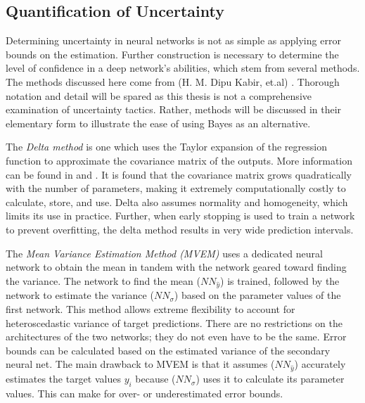 \subsection{Quantification of Uncertainty}

Determining uncertainty in neural networks is not as simple as applying error bounds on the estimation.  Further construction is necessary to determine the level of confidence in a deep network's abilities, which stem from several methods.  The methods discussed here come from (H. M. Dipu Kabir, et.al) \cite{8371683}.  Thorough notation and detail will be spared as this thesis is not a comprehensive examination of uncertainty tactics.  Rather, methods will be discussed in their elementary form to illustrate the ease of using Bayes as an alternative.

The \textit{Delta method} is one which uses the Taylor expansion of the regression function to approximate the covariance matrix of the outputs.  More information can be found in \cite{nilsen2022epistemic} and \cite{hwang1997prediction}.  It is found that the covariance matrix grows quadratically with the number of parameters, making it extremely computationally costly to calculate, store, and use.  Delta also assumes normality and homogeneity, which limits its use in practice.  Further, when early stopping is used to train a network to prevent overfitting, the delta method results in very wide prediction intervals.

The \textit{Mean Variance Estimation Method (MVEM)} uses a dedicated neural network to obtain the mean in tandem with the network geared toward finding the variance.  The network to find the mean ($NN_{\hat{y}}$) is trained, followed by the network to estimate the variance ($NN_{\sigma}$) based on the parameter values of the first network.  This method allows extreme flexibility to account for heteroscedastic variance of target predictions.  There are no restrictions on the architectures of the two networks; they do not even have to be the same.  Error bounds can be calculated based on the estimated variance of the secondary neural net.  The main drawback to MVEM is that it assumes ($NN_{\hat{y}}$) accurately estimates the target values $y_i$ because ($NN_{\sigma}$) uses it to calculate its parameter values.  This can make for over- or underestimated error bounds.

